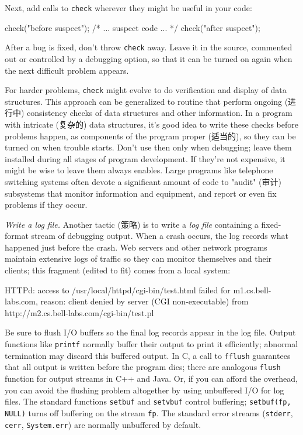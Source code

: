 Next, add calls to \verb'check' wherever they might be useful in your code:
\begin{wellcode}
    check("before suspect");
    /* ... suspect code ... */
    check("after suspect");
\end{wellcode}

After a bug is fixed, don't throw \verb'check' away. Leave it in the
source, commented out or controlled by a debugging option, so that it can
be turned on again when the next difficult problem appears.

For harder problems, \verb'check' might evolve to do verification and
display of data structures. This approach can be generalized to routine
that perform ongoing (进行中) consistency checks of data structures and
other information. In a program with intricate (复杂的) data structures,
it's good idea to write these checks before problems happen, as
components of the program proper (适当的), so they can be turned on when
trouble starts. Don't use then only when debugging; leave them installed
during all stages of program development. If they're not expensive, it
might be wise to leave them always enables. Large programs like telephone
switching systems often devote a significant amount of code to "audit"
(审计) subsystems that monitor information and equipment, and report or
even fix problems if they occur.

\emph{Write a log file.} Another tactic (策略) is to write a \emph{log
    file} containing a fixed-format stream of debugging output. When a
crash occurs, the log records what happened just before the crash. Web
servers and other network programs maintain extensive logs of traffic so
they can monitor themselves and their clients; this fragment (edited to
fit) comes from a local system:
\begin{wellcode}
    HTTPd: access to /usr/local/httpd/cgi-bin/test.html
        failed for m1.cs.bell-labs.com,
        reason: client denied by server (CGI non-executable)
        from http://m2.cs.bell-labs.com/cgi-bin/test.pl
\end{wellcode}

Be sure to flush I/O buffers so the final log records appear in the log
file. Output functions like \verb'printf' normally buffer their output to
print it efficiently; abnormal termination may discard this buffered
output. In C, a call to \verb'fflush' guarantees that all output is written
before the program dies; there are analogous \verb'flush' function for
output streams in C++ and Java. Or, if you can afford the overhead, you can
avoid the flushing problem altogether by using unbuffered I/O for log
files. The standard functions \verb'setbuf' and \verb'setvbuf' control
buffering; \verb'setbuf(fp, NULL)' turns off buffering on the stream
\verb'fp'. The standard error streams (\verb'stderr', \verb'cerr',
\verb'System.err') are normally unbuffered by default.


